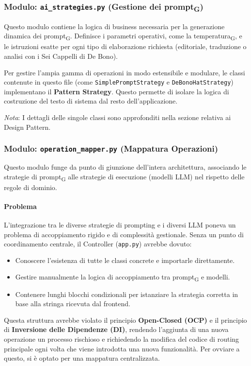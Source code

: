 \documentclass[11pt,a4paper]{article}
\newcommand{\gls}[1]{#1\textsubscript{G}}
\begin{document}
\subsubsection{Modulo: \texttt{ai\_strategies.py} (Gestione dei \gls{prompt})}
Questo modulo contiene la logica di business necessaria per la generazione dinamica dei \gls{prompt}. Definisce i parametri operativi, come la \gls{temperatura}, e le istruzioni esatte per ogni tipo di elaborazione richiesta (editoriale, traduzione o analisi con i Sei Cappelli di De Bono). 

Per gestire l'ampia gamma di operazioni in modo estensibile e modulare, le classi contenute in questo file (come \texttt{SimplePromptStrategy} e \texttt{DeBonoHatStrategy}) implementano il \textbf{Pattern Strategy}. Questo permette di isolare la logica di costruzione del testo di sistema dal resto dell'applicazione.

\textit{Nota}: I dettagli delle singole classi sono approfonditi nella sezione relativa ai Design Pattern.

\subsubsection{Modulo: \texttt{operation\_mapper.py} (Mappatura Operazioni)}
Questo modulo funge da punto di giunzione dell'intera architettura, associando le strategie di \gls{prompt} alle strategie di esecuzione (modelli LLM) nel rispetto delle regole di dominio.

\paragraph{Problema}
L’integrazione tra le diverse strategie di prompting e i diversi LLM poneva un problema di accoppiamento rigido e di complessità gestionale. Senza un punto di coordinamento centrale, il Controller (\texttt{app.py}) avrebbe dovuto:
\begin{itemize}
    \item Conoscere l'esistenza di tutte le classi concrete e importarle direttamente.
    \item Gestire manualmente la logica di accoppiamento tra \gls{prompt} e modelli.
    \item Contenere lunghi blocchi condizionali per istanziare la strategia corretta in base alla stringa ricevuta dal frontend.
\end{itemize}

Questa struttura avrebbe violato il principio \textbf{Open-Closed (OCP)} e il principio di \textbf{Inversione delle Dipendenze (DI)}, rendendo l'aggiunta di una nuova operazione un processo rischioso e richiedendo la modifica del codice di routing principale ogni volta che viene introdotta una nuova funzionalità. Per ovviare a questo, si è optato per una mappatura centralizzata.
\end{document}
